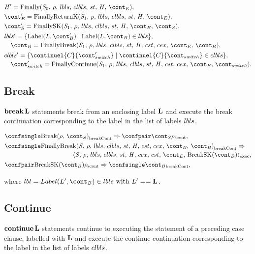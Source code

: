 \documentclass[a4paper,oneside]{article}
\newcommand{\synt}[1]{\ensuremath{\text{\textbf{#1}}}}
\DeclareMathOperator{\bbreak}{\synt{break}}
\DeclareMathOperator{\continue}{\synt{continue}}
\newcommand{\cesktrans}[2]{\ensuremath{{#1} \Rightarrow {#2}}}
\newcommand{\cesktranssplit}[2]{\ensuremath{{#1} \Rightarrow\\ {#2}}}
\begin{document}
\begin{align*}
&\handler' = \FinallyK{\stmti{0}},\\
&\econt' = \FinallyReturnK{\stmti{1}},\\
&\scont' = \FinallySK{\stmti{1}},\\
&\begin{multlined}
    \lbls' = \lbrace \mathrm{Label}(L, \bcont') \mid \mathrm{Label}(L, \bcont) \in \lbls\rbrace,\\
    \bcont = \FinallyBreak{\stmti{1}}{\bcont},
\end{multlined}\\
&\begin{multlined}
    \clbls' =  \lbrace \continuel{C}{\switchcont'} \mid  \continuel{C}{\switchcont} \in \clbls\rbrace,\\
    \switchcont' = \FinallyContinue{\stmti{1}}{\switchcont}.
\end{multlined}
\end{align*}


\subsection{Break}

$\bbreak \synt{L}$ statements break from an enclosing label $\synt{L}$ and execute the break continuation corresponding to the label in the list of labels $lbls$.

\begin{align*}
    &\cesktrans%
        {\breakconf{\Break{\env}{\scont}}}%
        {\scontconf{\scont}{\env}},\\
    &\begin{multlined}
        \cesktranssplit%
            {\breakconf{\FinallyBreak{\stmt}{\bcont}}}%
            {\execconf{\stmt}{\env}{\lbls}{\clbls}{\handler}{\cex}{\cstrace}{\econt}{\mathrm{BreakSK}(\bcont)}},
    \end{multlined}\\
    &\cesktrans%
        {\scontconf{\mathrm{BreakSK}(\bcont)}{\env}}%
        {\breakconf{\bcont}},
\end{align*}

\noindent where $\lbl = Label(L', \bcont) \in \lbls \text{ with } L' == \mathbf{L}$.


\subsection{Continue}

$\continue \synt{L}$ statements continue to executing the statement of a preceding case clause, labelled with $\synt{L}$ and execute the continue continuation corresponding to the label in the list of labels $clbls$.
\end{document}

